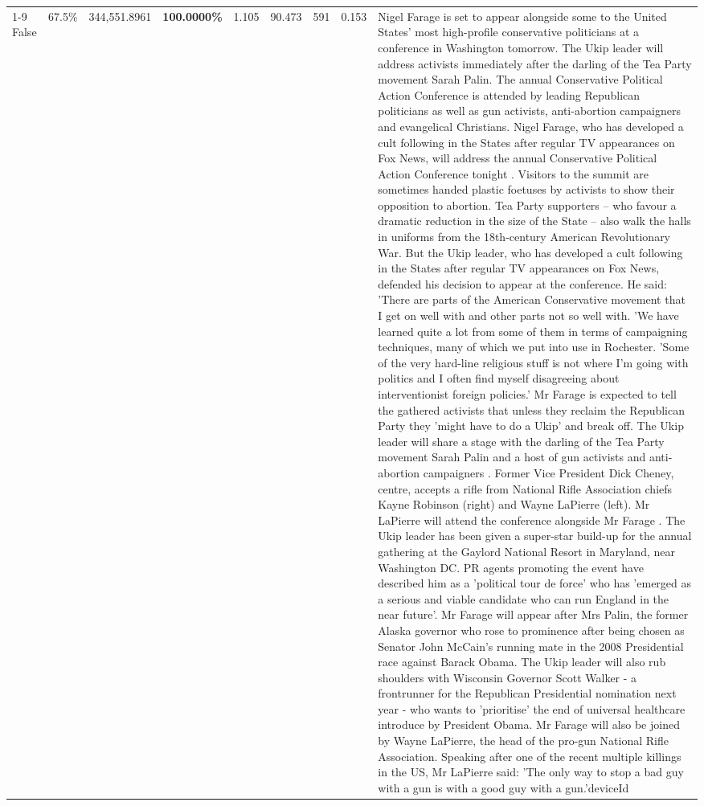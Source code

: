 \begin{table}[H]
\begin{tabular}{lllrlllll}
\cline{1-9} \cline{2-9}
False & 67.5\% & 344,551.8961 & \bfseries \color{red} 100.0000\% & 1.105 & 90.473 & 591 & 0.153 & Nigel Farage is set to appear alongside some to the United States' most high-profile conservative politicians at a conference in Washington tomorrow. The Ukip leader will address activists immediately after the darling of the Tea Party movement Sarah Palin. The annual Conservative Political Action Conference is attended by leading Republican politicians as well as gun activists, anti-abortion campaigners and evangelical Christians. Nigel Farage, who has developed a cult following in the States after regular TV appearances on Fox News, will address the annual Conservative Political Action Conference tonight . Visitors to the summit are sometimes handed plastic foetuses by activists to show their opposition to abortion. Tea Party supporters – who favour a dramatic reduction in the size of the State – also walk the halls in uniforms from the 18th-century American Revolutionary War. But the Ukip leader, who has developed a cult following in the States after regular TV appearances on Fox News, defended his decision to appear at the conference. He said: 'There are parts of the American Conservative movement that I get on well with and other parts not so well with. 'We have learned quite a lot from some of them in terms of campaigning techniques, many of which we put into use in Rochester. 'Some of the very hard-line religious stuff is not where I'm going with politics and I often find myself disagreeing about interventionist foreign policies.' Mr Farage is expected to tell the gathered activists that unless they reclaim the Republican Party they 'might have to do a Ukip' and break off. The Ukip leader will share a stage with the darling of the Tea Party movement Sarah Palin and a host of gun activists and anti-abortion campaigners . Former Vice President Dick Cheney, centre, accepts a rifle from National Rifle Association chiefs Kayne Robinson (right) and Wayne LaPierre (left). Mr LaPierre will attend the conference alongside Mr Farage . The Ukip leader has been given a super-star build-up for the annual gathering at the Gaylord National Resort in Maryland, near Washington DC. PR agents promoting the event have described him as a 'political tour de force' who has 'emerged as a serious and viable candidate who can run England in the near future'. Mr Farage will appear after Mrs Palin, the former Alaska governor who rose to prominence after being chosen as Senator John McCain's running mate in the 2008 Presidential race against Barack Obama. The Ukip leader will also rub shoulders with Wisconsin Governor Scott Walker - a frontrunner for the Republican Presidential nomination next year - who wants to 'prioritise' the end of universal healthcare introduce by President Obama. Mr Farage will also be joined by Wayne LaPierre, the head of the pro-gun National Rifle Association. Speaking after one of the recent multiple killings in the US, Mr LaPierre said: 'The only way to stop a bad guy with a gun is with a good guy with a gun.'deviceId \\

\end{tabular}
\end{table}
